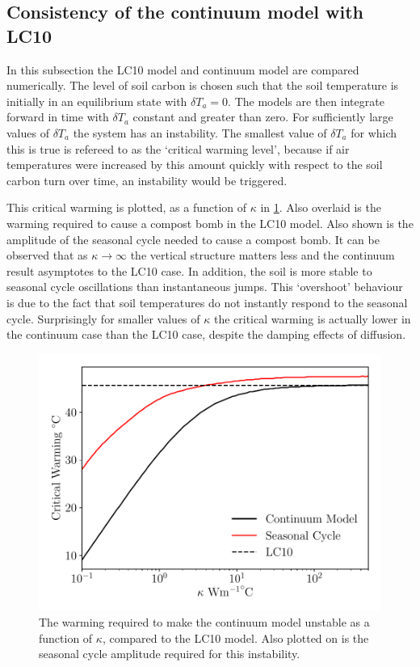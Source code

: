 \subsection{Consistency of the continuum model with LC10}
\label{sec:consistency_with_LC10}
In this subsection the LC10 model and continuum model are compared numerically. The level of soil carbon is chosen such that the soil temperature is
initially in an equilibrium state with $\delta T_{a} = 0$. The models are then integrate forward in time with $\delta T_a$ constant and greater than zero.
For sufficiently large values of $\delta T_a$ the system has an instability. The smallest value of $\delta T_a$ for which this is true is refereed to
as the `critical warming level', because if air temperatures were increased by this amount quickly with respect to the soil carbon turn over time,
an instability would be triggered.

This critical warming is plotted, as a function of $\kappa$ in \cref{fig:comparison_with_lc10}.
Also overlaid is the warming required to cause a compost bomb in the LC10
model. Also shown is the amplitude of the seasonal cycle needed to cause a compost bomb.
It can be observed that as $\kappa\rightarrow\infty$ the vertical structure matters less and the continuum result asymptotes to the LC10 case. In addition, the soil is more stable
to seasonal cycle oscillations than instantaneous jumps. This `overshoot' behaviour \parencite{Ritchie2019,Ritchie2021} is due to the fact that soil temperatures do not instantly respond to the seasonal cycle.
Surprisingly for smaller values of $\kappa$ the critical warming is actually lower in the continuum case than the LC10 case,
despite the damping effects of diffusion.
\begin{figure}
  \centering
  \includegraphics[keepaspectratio,scale=0.5]{dimensional_continuum_vs_lc10}
  \caption[Critical warming level in the continuum compost bomb]{The warming required to make the continuum model unstable as a function of $\kappa$, compared to the LC10 model.
    Also plotted on is the seasonal cycle amplitude required for this instability.}
  \label{fig:comparison_with_lc10}
\end{figure}

